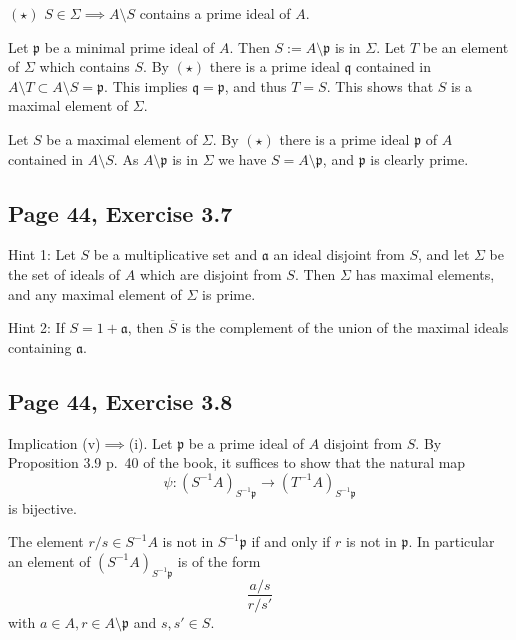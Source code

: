 \documentclass[parskip=half,fontsize=12pt]{scrartcl}%
\newcommand{\mf}{\mathfrak}
\newcommand{\aaa}{\mf a}
\newcommand{\ppp}{\mf p}
\newcommand{\qqq}{\mf q}
\begin{document}
$(\star)$ $S\in\Sigma\implies A\setminus S$ contains a prime ideal of $A$.

Let $\ppp$ be a minimal prime ideal of $A$. Then $S:=A\setminus\ppp$ is in $\Sigma$. Let $T$ be an element of $\Sigma$ which contains $S$. By $(\star)$ there is a prime ideal $\qqq$ contained in $A\setminus T\subset A\setminus S=\ppp$. This implies $\qqq=\ppp$, and thus $T=S$. This shows that $S$ is a maximal element of $\Sigma$. 

Let $S$ be a maximal element of $\Sigma$. By $(\star)$ there is a prime ideal $\ppp$ of $A$ contained in $A\setminus S$. As $A\setminus\ppp$ is in $\Sigma$ we have $S=A\setminus\ppp$, and $\ppp$ is clearly prime.


\subsection{Page 44, Exercise 3.7}%

Hint 1: Let $S$ be a multiplicative set and $\aaa$ an ideal disjoint from $S$, and let $\Sigma$ be the set of ideals of $A$ which are disjoint from $S$. Then $\Sigma$ has maximal elements, and any maximal element of $\Sigma$ is prime.

Hint 2: If $S=1+\aaa$, then $\overline S$ is the complement of the union of the maximal ideals containing $\aaa$.

\subsection{Page 44, Exercise 3.8}%

Implication (v)$\implies$(i). Let $\ppp$ be a prime ideal of $A$ disjoint from $S$. By Proposition 3.9 p.~40 of the book, it suffices to show that the natural map 
$$
\psi:(S^{-1}A)_{S^{-1}\ppp}\to(T^{-1}A)_{S^{-1}\ppp}
$$ 
is bijective. 

The element $r/s\in S^{-1}A$ is not in $S^{-1}\ppp$ if and only if $r$ is not in $\ppp$. In particular an element of $(S^{-1}A)_{S^{-1}\ppp}$ is of the form 
$$
\frac{a/s}{r/s'}
$$ 
with $a\in A, r\in A\setminus\ppp$ and $s,s'\in S$.
\end{document}
